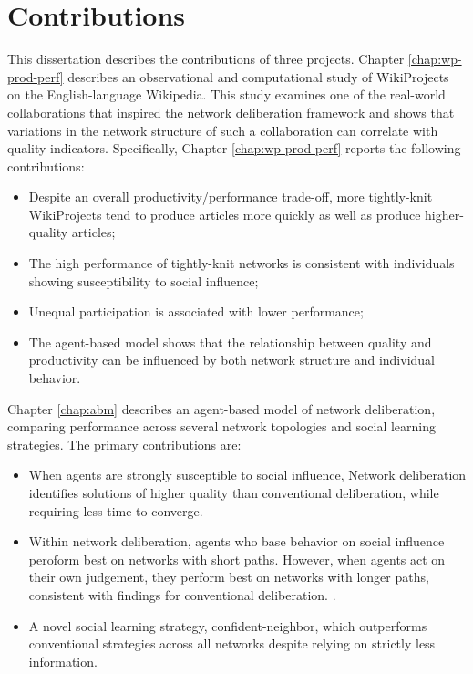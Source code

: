 \section{Contributions}
This dissertation describes the contributions of three projects.
Chapter \ref{chap:wp-prod-perf} describes an observational and computational
study of WikiProjects on the English-language Wikipedia.
This study examines one of the real-world collaborations that inspired the network deliberation
framework and shows that variations in the network structure of such a collaboration can
correlate with quality indicators.
Specifically, Chapter \ref{chap:wp-prod-perf} reports the following contributions:
\begin{itemize}
\setlength\itemsep{0pt}
\item Despite an overall productivity/performance trade-off,
more tightly-knit WikiProjects tend to produce articles more quickly as well as produce higher-quality articles;
\item The high performance of tightly-knit networks is consistent with individuals showing susceptibility to social influence;
\item Unequal participation is associated with lower performance;
\item The agent-based model shows that the relationship between quality and productivity can be influenced by both network structure and individual behavior.
\end{itemize}

Chapter \ref{chap:abm} describes an agent-based model of network deliberation,
comparing performance across several network topologies and social learning
strategies.
The primary contributions are:
\begin{itemize}
\setlength\itemsep{0pt}
\item When agents are strongly susceptible to social influence,
Network deliberation identifies solutions of higher quality than
conventional deliberation,
while requiring less time to converge.
\item Within network deliberation,
agents who base behavior on social influence peroform best on networks with short paths.
However, when agents act on their own judgement,
they perform best on networks with longer paths,
consistent with findings for conventional deliberation.
\cite{barkoczi_social_2016}.
\item A novel social learning strategy, confident-neighbor,
which outperforms conventional strategies across all
networks despite relying on strictly less information.
\end{itemize}

